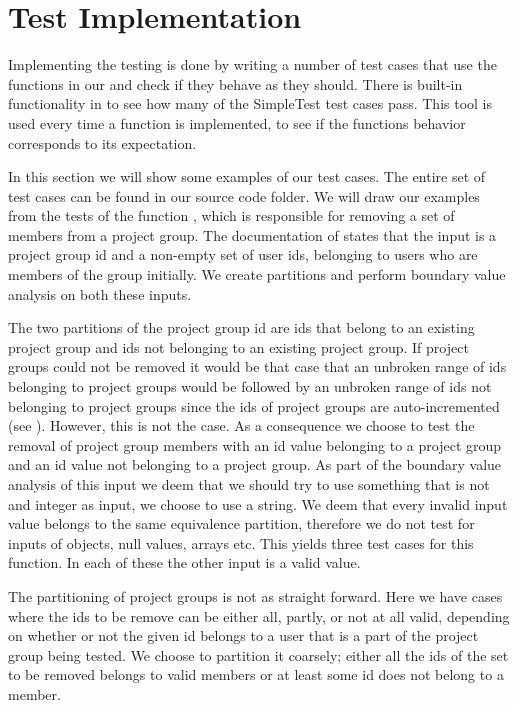 \section{Test Implementation}
\label{sec:testimplementation}
Implementing the testing is done by writing a number of test cases that use the functions in our \subsystem{} and check if they behave as they should.
There is built-in functionality in \moodle{} to see how many of the SimpleTest test cases pass.
This tool is used every time a function is implemented, to see if the functions behavior corresponds to its expectation.

In this section we will show some examples of our test cases.
The entire set of test cases can be found in our source code folder.
We will draw our examples from the tests of the function , which is responsible for removing a set of members from a project group.
The documentation of  states that the input is a project group id and a non-empty set of user ids, belonging to users who are members of the group initially.
We create partitions and perform boundary value analysis on both these inputs.

The two partitions of the project group id are ids that belong to an existing project group and ids not belonging to an existing project group.
If project groups could not be removed it would be that case that an unbroken range of ids belonging to project groups would be followed by an unbroken range of ids not belonging to project groups since the ids of project groups are auto-incremented (see ).
However, this is not the case.
As a consequence we choose to test the removal of project group members with an id value belonging to a project group and an id value not belonging to a project group.
As part of the boundary value analysis of this input we deem that we should try to use something that is not and integer as input, we choose to use a string.
We deem that every invalid input value belongs to the same equivalence partition, therefore we do not test for inputs of objects, null values, arrays etc.
This yields three test cases for this function.
In each of these the other input is a valid value.

The partitioning of project groups is not as straight forward.
Here we have cases where the ids to be remove can be either all, partly, or not at all valid, depending on whether or not the given id belongs to a user that is a part of the project group being tested.
We choose to partition it coarsely; either all the ids of the set to be removed belongs to valid members or at least some id does not belong to a member.


